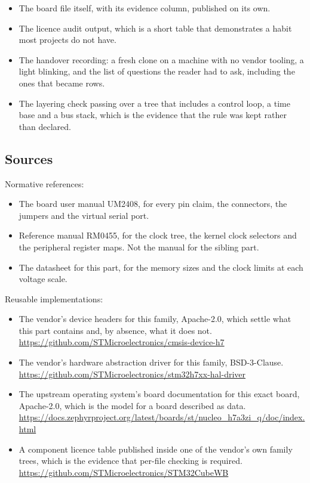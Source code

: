 \begin{itemize}
\item The board file itself, with its evidence column, published on its own.
\item The licence audit output, which is a short table that demonstrates a
habit most projects do not have.
\item The handover recording: a fresh clone on a machine with no vendor tooling,
a light blinking, and the list of questions the reader had to ask, including the
ones that became rows.
\item The layering check passing over a tree that includes a control loop, a
time base and a bus stack, which is the evidence that the rule was kept rather
than declared.
\end{itemize}

\subsection*{Sources}

Normative references:
\begin{itemize}
\item The board user manual UM2408, for every pin claim, the connectors, the
jumpers and the virtual serial port.
\item Reference manual RM0455, for the clock tree, the kernel clock selectors
and the peripheral register maps. Not the manual for the sibling part.
\item The datasheet for this part, for the memory sizes and the clock limits at
each voltage scale.
\end{itemize}

Reusable implementations:
\begin{itemize}
\item The vendor's device headers for this family, Apache-2.0, which settle
what this part contains and, by absence, what it does not.\newline
\url{https://github.com/STMicroelectronics/cmsis-device-h7}
\item The vendor's hardware abstraction driver for this family,
BSD-3-Clause.\newline
\url{https://github.com/STMicroelectronics/stm32h7xx-hal-driver}
\item The upstream operating system's board documentation for this exact board,
Apache-2.0, which is the model for a board described as data.\newline
\url{https://docs.zephyrproject.org/latest/boards/st/nucleo_h7a3zi_q/doc/index.html}
\item A component licence table published inside one of the vendor's own family
trees, which is the evidence that per-file checking is required.\newline
\url{https://github.com/STMicroelectronics/STM32CubeWB}
\end{itemize}
